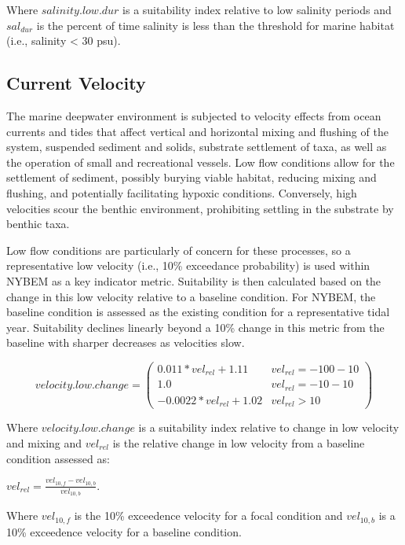 \documentclass[
]{book}
\begin{document}
Where \(salinity.low.dur\) is a suitability index relative to low salinity periods and \(sal_{dur}\) is the percent of time salinity is less than the threshold for marine habitat (i.e., salinity \textless{} 30 psu).

\hypertarget{current-velocity}{%
\subsection{Current Velocity}\label{current-velocity}}

The marine deepwater environment is subjected to velocity effects from ocean currents and tides that affect vertical and horizontal mixing and flushing of the system, suspended sediment and solids, substrate settlement of taxa, as well as the operation of small and recreational vessels. Low flow conditions allow for the settlement of sediment, possibly burying viable habitat, reducing mixing and flushing, and potentially facilitating hypoxic conditions. Conversely, high velocities scour the benthic environment, prohibiting settling in the substrate by benthic taxa.

Low flow conditions are particularly of concern for these processes, so a representative low velocity (i.e., 10\% exceedance probability) is used within NYBEM as a key indicator metric. Suitability is then calculated based on the change in this low velocity relative to a baseline condition. For NYBEM, the baseline condition is assessed as the existing condition for a representative tidal year. Suitability declines linearly beyond a 10\% change in this metric from the baseline with sharper decreases as velocities slow.

\[velocity.low.change = \begin{pmatrix} 0.011*vel_{rel}+1.11 & vel_{rel}=-100-10\\
1.0 & vel_{rel}=-10-10\\
-0.0022*vel_{rel}+1.02 & vel_{rel}>10
\end{pmatrix}\]

Where \(velocity.low.change\) is a suitability index relative to change in low velocity and mixing and \(vel_{rel}\) is the relative change in low velocity from a baseline condition assessed as:

\(vel_{rel}=\frac{vel_{10,f}-vel_{10,b}}{vel_{10,b}}\).

Where \(vel_{10,f}\) is the 10\% exceedence velocity for a focal condition and \(vel_{10,b}\) is a 10\% exceedence velocity for a baseline condition.
\end{document}
